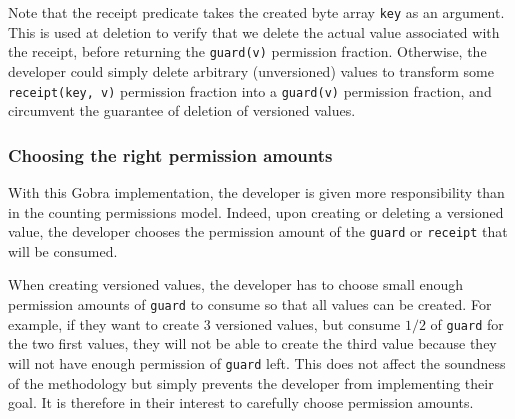 Note that the receipt predicate takes the created byte array \texttt{key} as an argument.
This is used at deletion to verify that we delete the actual value associated with the receipt, before returning the \texttt{guard(v)} permission fraction. Otherwise, the developer could simply delete arbitrary (unversioned) values to transform some \texttt{receipt(key, v)} permission fraction into a \texttt{guard(v)} permission fraction, and circumvent the guarantee of deletion of versioned values.




\subsubsection{Choosing the right permission amounts}
\label{sec:choosing-the-right-permission-amounts}

With this Gobra implementation, the developer is given more responsibility than in the counting permissions model.
Indeed, upon creating or deleting a versioned value, the developer chooses the permission amount of the \texttt{guard} or \texttt{receipt} that will be consumed.

When creating versioned values, the developer has to choose small enough permission amounts of \texttt{guard} to consume so that all values can be created.
For example, if they want to create $3$ versioned values, but consume $1/2$ of \texttt{guard} for the two first values, they will not be able to create the third value because they will not have enough permission of \texttt{guard} left.
This does not affect the soundness of the methodology but simply prevents the developer from implementing their goal.
It is therefore in their interest to carefully choose permission amounts.

